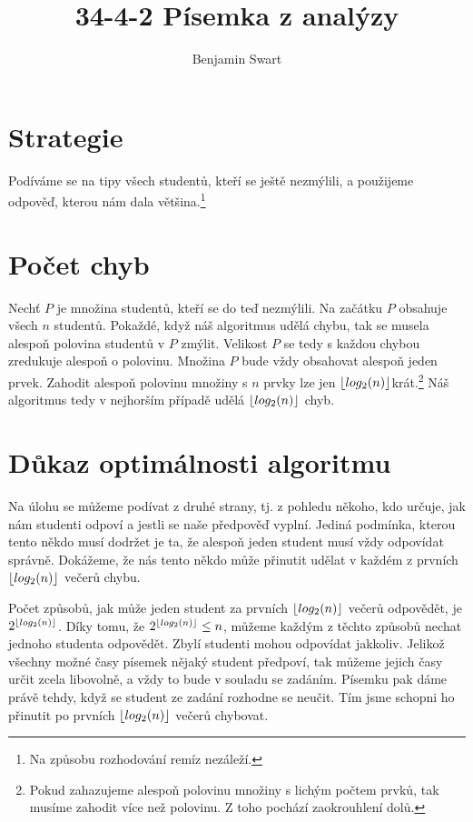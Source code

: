 \documentclass{article}
\title{34-4-2 Písemka z analýzy}
\author{Benjamin Swart}
\DeclarePairedDelimiter\floor{\lfloor}{\rfloor}
\begin{document}
\maketitle

\section{Strategie}

Podíváme se na tipy všech studentů, kteří se ještě nezmýlili, a použijeme odpověď, kterou nám dala většina.\footnote{Na způsobu rozhodování remíz nezáleží.}

\section{Počet chyb}

Nechť \(P\) je množina studentů, kteří se do teď nezmýlili. Na začátku \(P\) obsahuje všech \(n\) studentů. Pokaždé, když náš algoritmus udělá chybu, tak se musela alespoň polovina studentů v \(P\) zmýlit. Velikost \(P\) se tedy s každou chybou zredukuje alespoň o polovinu. Množina \(P\) bude vždy obsahovat alespoň jeden prvek. Zahodit alespoň polovinu množiny s \(n\) prvky lze jen \(\floor{log_2(n)}\)krát.\footnote{Pokud zahazujeme alespoň polovinu množiny s lichým počtem prvků, tak musíme zahodit více než polovinu. Z toho pochází zaokrouhlení dolů.} Náš algoritmus tedy v nejhorším případě udělá \(\floor{log_2(n)}\) chyb.

\section{Důkaz optimálnosti algoritmu}

Na úlohu se můžeme podívat z druhé strany, tj. z pohledu někoho, kdo určuje, jak nám studenti odpoví a jestli se naše předpověď vyplní. Jediná podmínka, kterou tento někdo musí dodržet je ta, že alespoň jeden student musí vždy odpovídat správně. Dokážeme, že nás tento někdo může přinutit udělat v každém z prvních \(\floor{log_2(n)}\) večerů chybu.

Počet způsobů, jak může jeden student za prvních \(\floor{log_2(n)}\) večerů odpovědět, je \(2^{\floor{log_2(n)}}\). Díky tomu, že \(2^{\floor{log_2(n)}} \le n\), můžeme každým z těchto způsobů nechat jednoho studenta odpovědět. Zbylí studenti mohou odpovídat jakkoliv. Jelikož všechny možné časy písemek nějaký student předpoví, tak můžeme jejich časy určit zcela libovolně, a vždy to bude v souladu se zadáním. Písemku pak dáme právě tehdy, když se student ze zadání rozhodne se neučit. Tím jsme schopni ho přinutit po prvních \(\floor{log_2(n)}\) večerů chybovat.
\end{document}
